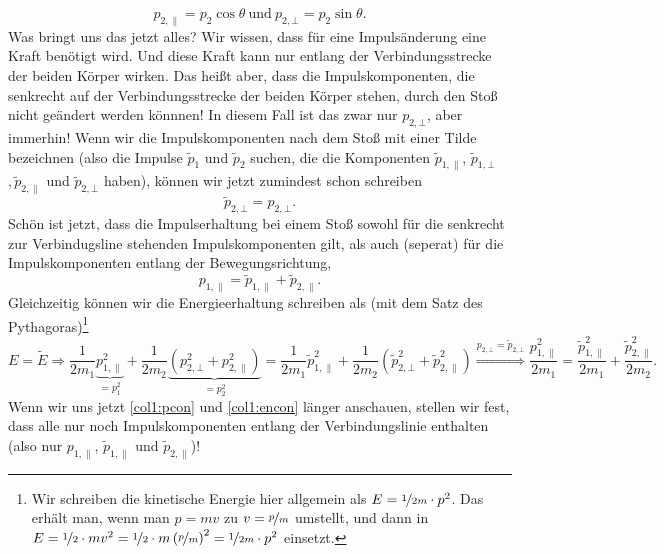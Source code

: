 \begin{Answer}[ref = col1]
	\begin{equation}\label{col1:pcom}
		p_{2,\parallel} = p_2\cos \theta ~\mathrm{und}~p_{2,\bot} = p_2 \sin \theta.
	\end{equation}
	Was bringt uns das jetzt alles? Wir wissen, dass für eine Impulsänderung eine Kraft benötigt wird. Und diese Kraft kann nur entlang der Verbindungsstrecke der beiden Körper wirken. Das heißt aber, dass die Impulskomponenten, die senkrecht auf der Verbindungsstrecke der beiden Körper stehen, durch den Stoß nicht geändert werden könnnen! In diesem Fall ist das zwar \glqq nur \grq{} $p_{2,\bot}$, aber immerhin! Wenn wir die Impulskomponenten nach dem Stoß mit einer Tilde bezeichnen (also die Impulse $\tilde{p}_{1}$ und $\tilde{p}_2$ suchen, die die Komponenten $\tilde{p}_{1,\parallel}$, $\tilde{p}_{1,\bot}$ $,\tilde{p}_{2,\parallel}$ und $\tilde{p}_{2,\bot}$ haben), können wir jetzt zumindest schon schreiben
	\begin{equation}\label{col1:p2on}
		\tilde{p}_{2,\bot} = p_{2,\bot}.
	\end{equation}
	Schön ist jetzt, dass die Impulserhaltung bei einem Stoß sowohl für die senkrecht zur Verbindugsline stehenden Impulskomponenten gilt, als auch (seperat) für die Impulskomponenten entlang der Bewegungsrichtung,
	\begin{equation}\label{col1:pcon}
		p_{1,\parallel} = \tilde{p}_{1,\parallel} + \tilde{p}_{2,\parallel}.
	\end{equation}
	Gleichzeitig können wir die Energieerhaltung schreiben als (mit dem Satz des Pythagoras)\footnote[2]{Wir schreiben die kinetische Energie hier allgemein als $E = \nicefrac{1}{2m}\cdot p^2$. Das erhält man, wenn man $p = m v$ zu $v = \nicefrac{p}{m}$ umstellt, und dann in $E = \nicefrac{1}{2}\cdot mv^2 = \nicefrac{1}{2}\cdot m \left(\nicefrac{p}{m}\right)^2 = \nicefrac{1}{2m}\cdot p^2$ einsetzt.  }
	\begin{equation}\label{col1:encon}
	E = \tilde{E}\Rightarrow	\frac{1}{2m_1} \underbrace{p_{1,\parallel}^2}_{= p_1^2} + \frac{1}{2m_2} \underbrace{\left(p_{2,\bot}^2+p_{2,\parallel}^2\right)}_{=p_2^2} = \frac{1}{2m_1}\tilde{p}_{1,\parallel}^2 + \frac{1}{2m_2}\left(\tilde{p}_{2,\bot}^2+\tilde{p}_{2,\parallel}^2\right) \overset{p_{2,\bot} = \tilde{p}_{2,\bot}}{\Rightarrow} \frac{p_{1,\parallel}^2}{2m_1}   = \frac{\tilde{p}_{1,\parallel}^2}{2m_1}  + \frac{\tilde{p}_{2,\parallel}^2}{2m_2}.
	\end{equation}
	Wenn wir uns jetzt \eqref{col1:pcon} und \eqref{col1:encon} länger anschauen, stellen wir fest, dass alle nur noch Impulskomponenten entlang der Verbindungslinie enthalten (also nur $p_{1,\parallel}$, $\tilde{p}_{1,\parallel}$ und $\tilde{p}_{2,\parallel}$)! \\

\end{Answer}
